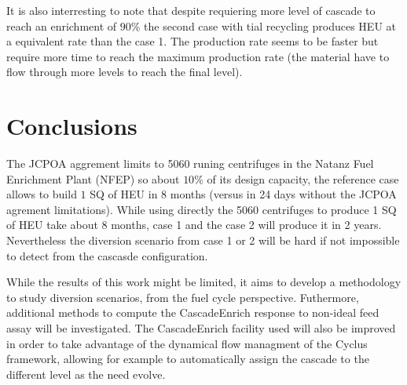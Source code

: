 \documentclass{anstrans}
\begin{document}
It is also interresting to note that despite requiering more level of cascade to
reach an enrichment of $90\%$ the second case with tial recycling produces HEU
at a equivalent rate than the case 1. The production rate seems to be faster but
require more time to reach the maximum production rate (the material have to
flow through more levels to reach the final level).


\section{Conclusions}

The JCPOA aggrement limits to 5060 runing centrifuges in the Natanz Fuel
Enrichment Plant (NFEP) so about $10\%$ of its design capacity, the reference
case allows to build $1$ SQ of HEU in 8 months (versus in 24 days without the JCPOA
agrement limitations). While using directly the 5060 centrifuges to produce 1 SQ
of HEU take about 8 months, case 1 and the case 2 will produce it in 2 years.
Nevertheless the diversion scenario from case 1 or 2 will be hard if not
impossible to detect from the cascasde configuration.  

While the results of this work might be limited, it aims to develop a
methodology to study diversion scenarios, from the fuel cycle perspective.
Futhermore, additional methods to compute the CascadeEnrich response to
non-ideal feed assay will be investigated.  The CascadeEnrich facility used will
also be improved in order to take advantage of the dynamical flow managment of
the Cyclus framework, allowing for example to automatically assign the cascade
to the different level as the need evolve.
\end{document}
